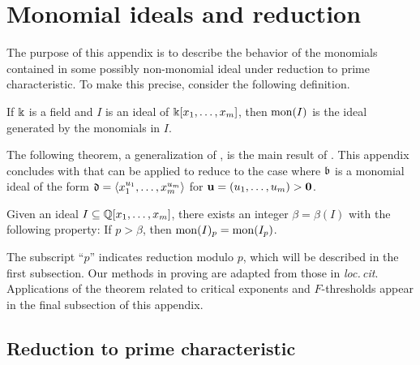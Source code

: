 \documentclass[11pt]{amsart}
\begin{document}
\newpage

\appendix

\section{Monomial ideals and reduction}
\label{monomial-reduction: A}

The purpose of this appendix is to describe the behavior of the monomials contained in some possibly non-monomial ideal under reduction to prime characteristic.  To make this precise, consider the following definition. 

\begin{definition}
If $\Bbbk$ is a field and $I$ is an ideal of $\Bbbk[x_1, \ldots, x_m]$, then $\operatorname{mon}(I)$ is the ideal generated by the monomials in $I$. %
\end{definition}

The following theorem, a generalization of \cite[Lemma 6.1]{budur+mustata+saito.roots_bs_polys_monomial}, is the main result of . This appendix concludes with  that can be applied to reduce  to the case where $\mathfrak{b}$ is a monomial ideal of the form $\mathfrak{d} = \langle x_1^{u_1}, \ldots, x_m^{u_m} \rangle$ for $\mathbf{u} = (u_1,\ldots,u_m) > \mathbf{0}$.

\begin{theorem}
   \label{mon-operation-modulo-p: T}
   Given an ideal $I \subseteq \mathbb{Q}[x_1, \ldots, x_m]$, there exists an integer $\beta = \beta(I)$ with the following property\textup:
   If $p > \beta$, then $\operatorname{mon}(I)_p = \operatorname{mon}(I_p)$.
\end{theorem}

The subscript ``$p$'' indicates reduction modulo $p$, which will be described in the first subsection. 
Our methods in proving  are adapted from those in \emph{loc.\,cit}.
Applications of the theorem related to critical exponents and $F$-thresholds 
appear in the final subsection of this appendix. 

\newpage

\subsection{Reduction to prime characteristic}

\newcommand{\maxi}{\mathfrak{m}}
\end{document}
